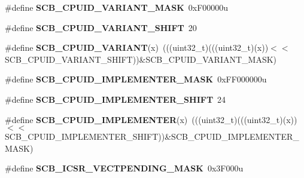 \begin{DoxyCompactItemize}
\item 
\mbox{\label{group___s_c_b___register___masks_ga42f96b8e820835b499d29a04e593d363}} 
\#define {\bfseries S\+C\+B\+\_\+\+C\+P\+U\+I\+D\+\_\+\+V\+A\+R\+I\+A\+N\+T\+\_\+\+M\+A\+SK}~0x\+F00000u
\item 
\mbox{\label{group___s_c_b___register___masks_ga810d19688c9813a71a60087f8ad98b2f}} 
\#define {\bfseries S\+C\+B\+\_\+\+C\+P\+U\+I\+D\+\_\+\+V\+A\+R\+I\+A\+N\+T\+\_\+\+S\+H\+I\+FT}~20
\item 
\mbox{\label{group___s_c_b___register___masks_ga70aaff3998444e48466b386b2ce07553}} 
\#define {\bfseries S\+C\+B\+\_\+\+C\+P\+U\+I\+D\+\_\+\+V\+A\+R\+I\+A\+NT}(x)~(((uint32\+\_\+t)(((uint32\+\_\+t)(x))$<$$<$S\+C\+B\+\_\+\+C\+P\+U\+I\+D\+\_\+\+V\+A\+R\+I\+A\+N\+T\+\_\+\+S\+H\+I\+FT))\&S\+C\+B\+\_\+\+C\+P\+U\+I\+D\+\_\+\+V\+A\+R\+I\+A\+N\+T\+\_\+\+M\+A\+SK)
\item 
\mbox{\label{group___s_c_b___register___masks_gab1f83660e1dfa68aeccfed5a890725a9}} 
\#define {\bfseries S\+C\+B\+\_\+\+C\+P\+U\+I\+D\+\_\+\+I\+M\+P\+L\+E\+M\+E\+N\+T\+E\+R\+\_\+\+M\+A\+SK}~0x\+F\+F000000u
\item 
\mbox{\label{group___s_c_b___register___masks_ga6729af9d9ed3840dae99f10bb2feb44d}} 
\#define {\bfseries S\+C\+B\+\_\+\+C\+P\+U\+I\+D\+\_\+\+I\+M\+P\+L\+E\+M\+E\+N\+T\+E\+R\+\_\+\+S\+H\+I\+FT}~24
\item 
\mbox{\label{group___s_c_b___register___masks_gad05c2dd61538f0fa4ecbb190e78715cd}} 
\#define {\bfseries S\+C\+B\+\_\+\+C\+P\+U\+I\+D\+\_\+\+I\+M\+P\+L\+E\+M\+E\+N\+T\+ER}(x)~(((uint32\+\_\+t)(((uint32\+\_\+t)(x))$<$$<$S\+C\+B\+\_\+\+C\+P\+U\+I\+D\+\_\+\+I\+M\+P\+L\+E\+M\+E\+N\+T\+E\+R\+\_\+\+S\+H\+I\+FT))\&S\+C\+B\+\_\+\+C\+P\+U\+I\+D\+\_\+\+I\+M\+P\+L\+E\+M\+E\+N\+T\+E\+R\+\_\+\+M\+A\+SK)
\item 
\mbox{\label{group___s_c_b___register___masks_ga75b38d5feedc920a7d0a51484330b7d7}} 
\#define {\bfseries S\+C\+B\+\_\+\+I\+C\+S\+R\+\_\+\+V\+E\+C\+T\+P\+E\+N\+D\+I\+N\+G\+\_\+\+M\+A\+SK}~0x3\+F000u

\end{DoxyCompactItemize}
